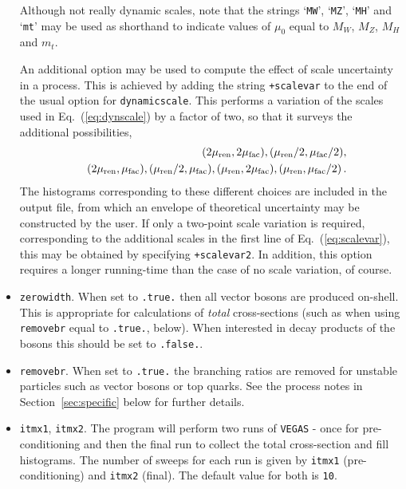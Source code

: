 \documentclass{article}
\begin{document}
\begin{itemize}
Although not really dynamic scales, note that the strings `{\tt MW}', `{\tt MZ}',
`{\tt MH}' and `{\tt mt}' may be used as shorthand to indicate values of $\mu_0$ equal to
$M_W$, $M_Z$, $M_H$ and $m_t$. 

An additional option may be used to compute the effect of scale uncertainty in a process.  This is
achieved by adding the string {\tt +scalevar} to the end of the usual option for {\tt dynamicscale}.
This performs a variation of the scales used in Eq.~(\ref{eq:dynscale}) by a factor of two, so that it
surveys the additional possibilities,
\begin{eqnarray}
&&
(2\mu_{\rm ren},2\mu_{\rm fac}),
(\mu_{\rm ren}/2,\mu_{\rm fac}/2), \nonumber \\ &&
(2\mu_{\rm ren},\mu_{\rm fac}),
(\mu_{\rm ren}/2,\mu_{\rm fac}),
(\mu_{\rm ren},2\mu_{\rm fac}),
(\mu_{\rm ren},\mu_{\rm fac}/2) \,.
\label{eq:scalevar}
\end{eqnarray}
The histograms corresponding to these different choices are included in the output file, from which an
envelope of theoretical uncertainty may be constructed by the user.  If only a two-point scale
variation is required, corresponding to the additional scales in the first line of Eq.~(\ref{eq:scalevar}),
this may be obtained by specifying {\tt +scalevar2}. In addition,
this option requires a longer running-time than the case of no scale variation, of course.

\item {\tt zerowidth}. When set to {\tt .true.} then all vector
bosons are produced on-shell. This is appropriate for calculations
of {\it total} cross-sections (such as when using {\tt removebr} equal
to {\tt .true.}, below). When interested in decay products of the
bosons this should be set to {\tt .false.}.

\item {\tt removebr}. When set to {\tt .true.} the branching ratios are 
removed for unstable particles such as vector bosons or top quarks. See the
process notes in Section~\ref{sec:specific} below for further details.

\item {\tt itmx1}, {\tt itmx2}. The program will perform two runs of
{\tt VEGAS} - once for pre-conditioning and then the final run to
collect the total cross-section and fill histograms. The number of
sweeps for each run is given by {\tt itmx1} (pre-conditioning)
and {\tt itmx2} (final). The default value for both is {\tt 10}.



\end{itemize}
\end{document}

